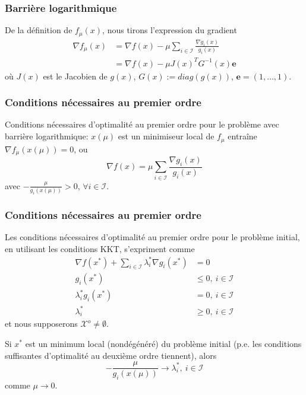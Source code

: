 \documentclass[usepdftitle=false,aspectratio=169]{beamer}
\def\cI{\mathcal{I}}
\def\cX{\mathcal{X}}
\def\be{\boldsymbol{e}}
\begin{document}
\begin{frame}
\frametitle{Barrière logarithmique}

De la définition de $f_{\mu}(x)$,
nous tirons l'expression du gradient
\begin{align*}
\nabla f_{\mu}(x) &= \nabla f(x) - \mu \sum_{i \in \cI} \frac{\nabla g_i(x)}{g_i(x)} \\
&= \nabla f(x) - \mu J(x)^T G^{-1}(x)\be
\end{align*}
où $J(x)$ est le Jacobien de $g(x)$, $G(x) := diag(g(x))$, $\be = (1,\ldots, 1)$.

\end{frame}

\begin{frame}
\frametitle{Conditions nécessaires au premier ordre}

Conditions nécessaires d'optimalité au premier ordre pour le problème avec barrière logarithmique: $x(\mu)$ est un minimiseur local de $f_{\mu}$ entraîne $\nabla f_{\mu}(x(\mu)) = 0$, ou
$$
\nabla f(x) = \mu \sum_{i \in \cI} \frac{\nabla g_i(x)}{g_i(x)}
$$
avec $-\frac{\mu}{g_i(x(\mu))} > 0$, $\forall i \in \cI$.

\end{frame}

\begin{frame}
\frametitle{Conditions nécessaires au premier ordre}

Les conditions nécessaires d'optimalité au premier ordre pour le problème initial, en utilisant les conditions KKT, s'expriment comme
\begin{align*}
\nabla f(x^*) + \sum_{i \in \cI} \lambda_i^* \nabla g_i(x^*) &= 0 \\
g_i(x^*) &\leq 0,\ i \in \cI \\
\lambda_i^* g_i(x^*) &= 0,\ i \in \cI \\
\lambda_i^* &\geq 0,\ i \in \cI
\end{align*}
et nous supposerons $\cX^o \ne \emptyset$.

\mbox{}

Si $x^*$ est un minimum local (nondégénéré) du problème initial (p.e. les conditions suffisantes d'optimalité au deuxième ordre tiennent), alors
$$
-\frac{\mu}{g_i(x(\mu))} \rightarrow \lambda_i^*,\ i \in \cI
$$
comme $\mu \rightarrow 0$.

\end{frame}
\end{document}
